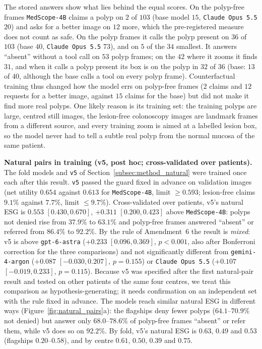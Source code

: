 \documentclass[5p,times,twocolumn,authoryear]{elsarticle}
\begin{document}
The stored answers show what lies behind the equal scores. On the polyp-free frames \texttt{MedScope-4B} claims a polyp on $2$ of $103$ (base model $15$, \texttt{Claude Opus 5.5} $20$) and asks for a better image on $12$ more, which the pre-registered measure does not count as safe. On the polyp frames it calls the polyp present on $36$ of $103$ (base $40$, \texttt{Claude Opus 5.5} $73$), and on $5$ of the $34$ smallest. It answers ``absent'' without a tool call on $53$ polyp frames; on the $42$ where it zooms it finds $31$, and when it calls a polyp present its box is on the polyp in $32$ of $36$ (base: $13$ of $40$, although the base calls a tool on every polyp frame). Counterfactual training thus changed how the model errs on polyp-free frames ($2$ claims and $12$ requests for a better image, against $15$ claims for the base) but did not make it find more real polyps. One likely reason is its training set: the training polyps are large, centred still images, the lesion-free colonoscopy images are landmark frames from a different source, and every training zoom is aimed at a labelled lesion box, so the model never had to tell a subtle real polyp from the normal mucosa of the same patient.

\textbf{Natural pairs in training (v5, post hoc; cross-validated over patients).} The fold models and \texttt{v5} of Section~\ref{subsec:method_natural} were trained once each after this result. \texttt{v5} passed the guard fixed in advance on validation images (net utility $0.654$ against $0.613$ for \texttt{MedScope-4B}, limit $\ge 0.593$; lesion-free claims $9.1\%$ against $7.7\%$, limit $\le 9.7\%$). Cross-validated over patients, v5's natural ESG is $0.553$ $[0.430, 0.670]$, $+0.311$ $[0.200, 0.423]$ above \texttt{MedScope-4B}: polyps not denied rise from $37.9\%$ to $63.1\%$ and polyp-free frames answered ``absent'' or referred from $86.4\%$ to $92.2\%$. By the rule of Amendment~6 the result is \emph{mixed}: v5 is above \texttt{gpt-6-astra} ($+0.233$ $[0.096, 0.369]$, $p < 0.001$, also after Bonferroni correction for the three comparisons) and not significantly different from \texttt{gemini-4-argon} ($+0.087$ $[-0.030, 0.207]$, $p = 0.155$) or \texttt{Claude Opus 5.5} ($+0.107$ $[-0.019, 0.233]$, $p = 0.115$). Because v5 was specified after the first natural-pair result and tested on other patients of the same four centres, we treat this comparison as hypothesis-generating; it needs confirmation on an independent set with the rule fixed in advance. The models reach similar natural ESG in different ways (Figure~\ref{fig:natural_pairs}a): the flagships deny fewer polyps ($64.1$--$70.9\%$ not denied) but answer only $68.0$--$78.6\%$ of polyp-free frames ``absent'' or refer them, while v5 does so on $92.2\%$. By fold, v5's natural ESG is $0.63$, $0.49$ and $0.53$ (flagships $0.20$--$0.58$), and by centre $0.61$, $0.50$, $0.39$ and $0.75$.
\end{document}
